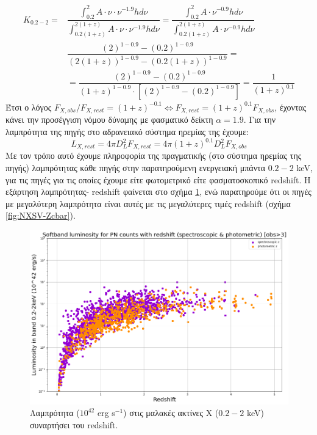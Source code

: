 \begin{equation} \begin{aligned} Κ_{0.2-2} =  {} & \dfrac{\int_{0.2}^{2} A \cdot \nu \cdot \nu^{-1.9} hd\nu}{\int_{0.2(1+z)}^{2(1+z)}A \cdot \nu \cdot \nu^{-1.9} hd\nu} =  \dfrac{\int_{0.2}^{2} A  \cdot \nu^{-0.9} hd\nu}{\int_{0.2(1+z)}^{2(1+z)}A  \cdot \nu^{-0.9} hd\nu}
\\  & \dfrac{(2)^{1-0.9}-(0.2)^{1-0.9}}{(2(1+z))^{1-0.9}-(0.2(1+z))^{1-0.9}}=\\ & = \dfrac{(2)^{1-0.9}-(0.2)^{1-0.9}}{(1+z)^{1-0.9}\cdot[(2)^{1-0.9}-(0.2)^{1-0.9}]} = \dfrac{1}{(1+z)^{0.1}} \label{eq:K-correction}\end{aligned}\end{equation}
Έτσι ο λόγος  ${F_{X,obs}}/{F_{X,rest}} = (1+z)^{-0.1} \iff {F_{X,rest}} = (1+z)^{0.1} {F_{X,obs}} $, έχοντας κάνει την προσέγγιση νόμου δύναμης με φασματικό δείκτη $\alpha = 1.9$.
Για την λαμπρότητα της πηγής στο αδρανειακό σύστημα ηρεμίας της έχουμε:
\begin{equation}L_{X,rest} = 4\pi D_L^2 F_{X,rest} = 4\pi(1+z)^{0.1} D_L^2 F_{X,obs} \label{eq:LumiFluxRest}\end{equation} 
Με τον τρόπο αυτό έχουμε πληροφορία της πραγματικής (στο σύστημα ηρεμίας της πηγής) λαμπρότητας κάθε πηγής στην παρατηρούμενη ενεργειακή μπάντα $0.2-2$ \textlatin{keV}, για τις πηγές για τις οποίες έχουμε είτε φωτομετρικό είτε φασματοσκοπικό \textlatin{redshift}. Η εξάρτηση λαμπρότητας- \textlatin{redshift} φαίνεται στο σχήμα \ref{fig:LumiRed}, ενώ παρατηρούμε ότι οι πηγές με μεγαλύτερη λαμπρότητα είναι αυτές με τις μεγαλύτερες τιμές \textlatin{redshift} (σχήμα \ref{fig:NXSV-Zcbar}).

 \begin{figure}
 \begin{center}
 \includegraphics[width=0.8 \linewidth]{Figures/Lumi_Red.png}
 \caption{Λαμπρότητα ($ 10^{42}$ \textlatin{erg s}$^{-1}$) στις μαλακές ακτίνες Χ ($0.2-2$ \textlatin{keV}) συναρτήσει του \textlatin{redshift.}}
 \label{fig:LumiRed}
 \end{center}
 \end{figure}
 
